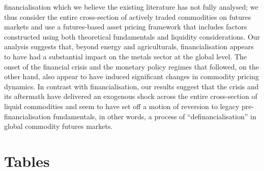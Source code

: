 \documentclass[]{elsarticle} %
\begin{document}
financialisation which we believe the existing literature has not fully analysed; we thus consider the entire cross-section of actively traded commodities on futures markets and use a futures-based asset pricing framework that includes factors constructed using both theoretical fundamentals and liquidity considerations. Our analysis suggests that, beyond energy and agriculturals, financialisation appears to have had a substantial impact on the metals sector at the global level. The onset of the financial crisis and the monetary policy regimes that followed, on the other hand, also appear to have induced significant changes in commodity pricing dynamics. In contrast with financialisation, our results suggest that the crisis and its aftermath have delivered an exogenous shock across the entire cross-section of liquid commodities and seem to have set off a motion of reversion to legacy pre-financialisation fundamentals, in other words, a process of ``definancialisation'' in global commodity futures markets.

\cleardoublepage{}

\hypertarget{tables}{%
\section*{Tables}\label{tables}}

\begingroup\fontsize{9}{11}\selectfont
\end{document}
